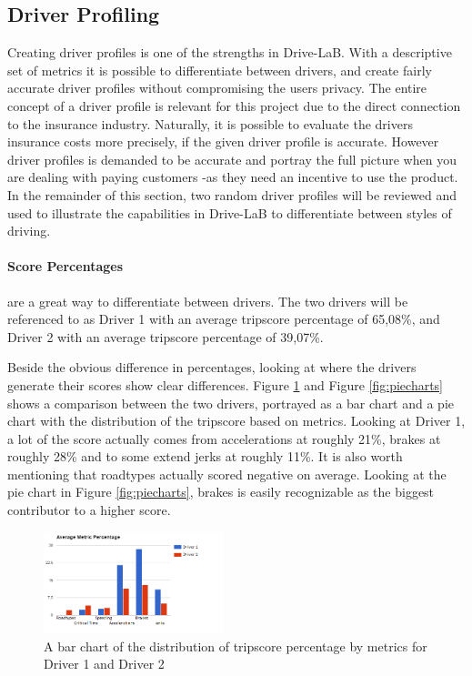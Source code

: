 \subsection{Driver Profiling}\label{subsec:userprofiling}

Creating driver profiles is one of the strengths in Drive-LaB. With a descriptive set of metrics it is possible to differentiate between drivers, and create fairly accurate driver profiles without compromising the users privacy. The entire concept of a driver profile is relevant for this project due to the direct connection to the insurance industry. Naturally, it is possible to evaluate the drivers insurance costs more precisely, if the given driver profile is accurate. However driver profiles is demanded to be accurate and portray the full picture when you are dealing with paying customers\citep{art:insurtelematics} -as they need an incentive to use the product. In the remainder of this section, two random driver profiles will be reviewed and used to illustrate the capabilities in Drive-LaB to differentiate between styles of driving.  

\paragraph{Score Percentages} are a great way to differentiate between drivers. The two drivers will be referenced to as Driver 1 with an average tripscore percentage of 65,08\%, and Driver 2 with an average tripscore percentage of 39,07\%.

Beside the obvious difference in percentages, looking at where the drivers generate their scores show clear differences. Figure \ref{fig:avgmetricper} and Figure \ref{fig:piecharts} shows a comparison between the two drivers, portrayed as a bar chart and a pie chart with the distribution of the tripscore based on metrics. Looking at Driver 1, a lot of the score actually comes from accelerations at roughly 21\%, brakes at roughly 28\% and to some extend jerks at roughly 11\%. It is also worth mentioning that roadtypes actually scored negative on average. Looking at the pie chart in Figure \ref{fig:piecharts}, brakes is easily recognizable as the biggest contributor to a higher score.

\begin{figure}[tb]
\centering
\includegraphics[width=0.465\textwidth]{Pictures/AverageMetricsPercentage}
\caption{A bar chart of the distribution of tripscore percentage by metrics for Driver 1 and Driver 2}
\label{fig:avgmetricper}
\end{figure}

